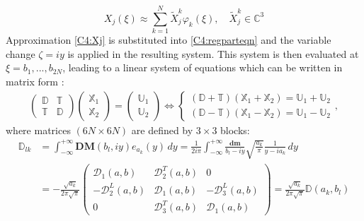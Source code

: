 \begin{equation}
 X_j(\xi) \approx \sum_{k=1}^N \tilde{X}_j^k \varphi_k(\xi) ,\hspace{1em} \tilde{X}_j^k \in \mathbb{C}^3
 \label{C4:Xj}
\end{equation}
Approximation \eqref{C4:Xj} is substituted into \eqref{C4:regparteqn} and the variable change $\zeta=iy$ is applied in the resulting system. This system is then evaluated at $\xi=b_1,...,b_{2N}$, leading to a linear system of equations which can be written in matrix form :
\begin{eqnarray}
\begin{pmatrix}
\mathbb{D}&\mathbb{T}\\
\mathbb{T}&\mathbb{D}
\end{pmatrix}
\begin{pmatrix}
\mathbb{X}_1 \\
\mathbb{X}_2
\end{pmatrix}
=
\begin{pmatrix}
\mathbb{U}_1 \\
\mathbb{U}_2
\end{pmatrix}
\Leftrightarrow
\left\{
\begin{array}{l}
(\mathbb{D}+\mathbb{T})(\mathbb{X}_1+\mathbb{X}_2)= \mathbb{U}_1+\mathbb{U}_2 \\
(\mathbb{D}-\mathbb{T})(\mathbb{X}_1-\mathbb{X}_2)= \mathbb{U}_1-\mathbb{U}_2
\end{array}
	\right.,
\label{C4:systmat}
\end{eqnarray}
where matrices $(6N\times 6N)$ are defined by $3\times3$ blocks:
\begin{equation}
\begin{split}
\mathbb{D}_{lk}&=\int_{-\infty}^{+\infty} \textbf{DM}(b_l,iy)e_{a_k}(y) \, dy =\frac{1}{2i\pi} \int_{-\infty}^{+\infty} \frac{\mathbf{dm}}{b_l-iy} 
\sqrt{\frac{a_k}{\pi}}\frac{1}{y-ia_k} \, dy \\
&=- \frac{\sqrt{a_k}}{2\pi \sqrt{\pi}}
\begin{pmatrix}
\mathcal{D}_1(a,b) &\mathcal{D}_2^T(a,b) &0\\
-\mathcal{D}_2^L(a,b) &\mathcal{D}_1(a,b)&-\mathcal{D}_3^L(a,b)\\
0&\mathcal{D}_3^T(a,b)&\mathcal{D}_1(a,b)
\end{pmatrix}=\frac{\sqrt{a_k}}{2\pi \sqrt{\pi}}\mathbb{D}(a_k,b_l)
\end{split}
\label{C4:Dab}
\end{equation}
